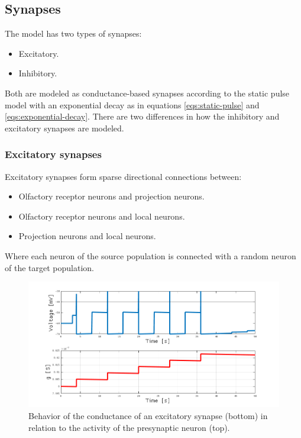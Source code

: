   \subsection{Synapses}
  The model has two types of synapses:

  \begin{multicols}{2}
    \begin{itemize}
      \item Excitatory.
      \item Inhibitory.
    \end{itemize}
  \end{multicols}

  Both are modeled as conductance-based synapses according to the static pulse model with an exponential decay as in equations \ref{eqs:static-pulse} and \ref{eqs:exponential-decay}.
  There are two differences in how the inhibitory and excitatory synapses are modeled.

    \subsubsection{Excitatory synapses}
    Excitatory synapses form sparse directional connections between:

    \begin{itemize}
      \item Olfactory receptor neurons and projection neurons.
      \item Olfactory receptor neurons and local neurons.
      \item Projection neurons and local neurons.
    \end{itemize}

    Where each neuron of the source population is connected with a random neuron of the target population.

    \begin{figure}
      \centering
      \includegraphics[width=\textwidth]{excitatory-synapses-conductance}
      \caption{Behavior of the conductance of an excitatory synapse (bottom) in relation to the activity of the presynaptic neuron (top).}
      \label{fig:excitatory-synapses-conductance}
    \end{figure}

